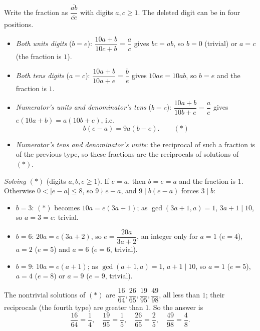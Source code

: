 Write the fraction as $\dfrac{\overline{ab}}{\overline{ce}}$ with digits $a,c\ge1$. The deleted digit can be in four positions.
\begin{itemize}
\item \emph{Both units digits} ($b=e$): $\dfrac{10a+b}{10c+b}=\dfrac ac$ gives $bc=ab$, so $b=0$ (trivial) or $a=c$ (the fraction is $1$).
\item \emph{Both tens digits} ($a=c$): $\dfrac{10a+b}{10a+e}=\dfrac be$ gives $10ae=10ab$, so $b=e$ and the fraction is $1$.
\item \emph{Numerator's units and denominator's tens} ($b=c$): $\dfrac{10a+b}{10b+e}=\dfrac ae$ gives $e(10a+b)=a(10b+e)$, i.e.
\[b(e-a)=9a(b-e).\qquad(*)\]
\item \emph{Numerator's tens and denominator's units}: the reciprocal of such a fraction is of the previous type, so these fractions are the reciprocals of solutions of $(*)$.
\end{itemize}
\emph{Solving $(*)$} (digits $a,b,e\ge1$). If $e=a$, then $b=e=a$ and the fraction is $1$. Otherwise $0<|e-a|\le8$, so $9\nmid e-a$, and $9\mid b(e-a)$ forces $3\mid b$:
\begin{itemize}
\item $b=3$: $(*)$ becomes $10a=e(3a+1)$; as $\gcd(3a+1,a)=1$, $3a+1\mid10$, so $a=3=e$: trivial.
\item $b=6$: $20a=e(3a+2)$, so $e=\dfrac{20a}{3a+2}$, an integer only for $a=1$ ($e=4$), $a=2$ ($e=5$) and $a=6$ ($e=6$, trivial).
\item $b=9$: $10a=e(a+1)$; as $\gcd(a+1,a)=1$, $a+1\mid10$, so $a=1$ ($e=5$), $a=4$ ($e=8$) or $a=9$ ($e=9$, trivial).
\end{itemize}
The nontrivial solutions of $(*)$ are $\dfrac{16}{64},\dfrac{26}{65},\dfrac{19}{95},\dfrac{49}{98}$, all less than $1$; their reciprocals (the fourth type) are greater than $1$. So the answer is
\[\boxed{\dfrac{16}{64}=\dfrac14,\quad\dfrac{19}{95}=\dfrac15,\quad\dfrac{26}{65}=\dfrac25,\quad\dfrac{49}{98}=\dfrac48}.\]
